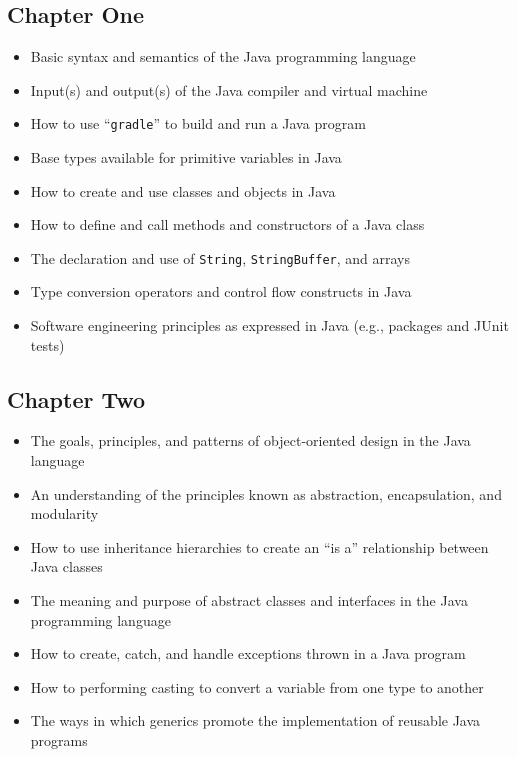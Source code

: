 \documentclass[11pt]{article}
\newcommand{\command}[1]{``\lstinline{#1}''}
\newcommand{\program}[1]{\lstinline{#1}}
\begin{document}
\vspace*{-.1in}

\subsection*{Chapter One}

\begin{itemize}

  \itemsep 0in

  \item Basic syntax and semantics of the Java programming language
  \item Input(s) and output(s) of the Java compiler and virtual machine
  \item How to use \command{gradle} to build and run a Java program
  \item Base types available for primitive variables in Java
  \item How to create and use classes and objects in Java
  \item How to define and call methods and constructors of a Java class
  \item The declaration and use of \program{String}, \program{StringBuffer}, and arrays
  \item Type conversion operators and control flow constructs in Java
  \item Software engineering principles as expressed in Java (e.g., packages and
    JUnit tests)

\end{itemize}

\vspace*{-.2in}
\subsection*{Chapter Two}

\begin{itemize}

  \itemsep 0in

  \item The goals, principles, and patterns of object-oriented design in the
    Java language
  \item An understanding of the principles known as abstraction, encapsulation, and modularity
  \item How to use inheritance hierarchies to create an ``is a'' relationship
    between Java classes
  \item The meaning and purpose of abstract classes and interfaces in the Java
    programming language
  \item How to create, catch, and handle exceptions thrown in a Java program
  \item How to performing casting to convert a variable from one type to another
  \item The ways in which generics promote the implementation of reusable Java
    programs

\end{itemize}
\end{document}
